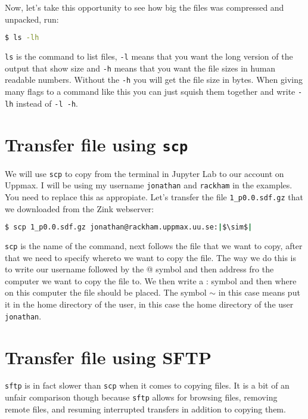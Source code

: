 \documentclass[watermark]{pbpreprint}
\begin{document}
\vspace{1\baselineskip}
Now, let's take this opportunity to see how big the files was compressed and
unpacked, run: 
\begin{lstlisting}[language=bash]
$ ls -lh
\end{lstlisting}
\texttt{ls} is the command to list files, \texttt{-l} means that you want the
long version of the output that show size and \texttt{-h} means that you want
the file sizes in human readable numbers. Without the \texttt{-h} you will get
the file size in bytes. When giving many flags to a command like this you can
just squish them together and write \texttt{-lh} instead of \texttt{-l -h}.

\section{Transfer file using \texttt{scp}}
 We will use \texttt{scp} to copy from the terminal
in Jupyter Lab to our account on Uppmax. I will be using my username
\texttt{jonathan} and \texttt{rackham} in the examples. You need to replace
this as appropiate. Let's transfer the file \texttt{1\_p0.0.sdf.gz} that we
downloaded from the Zink webserver:
\begin{lstlisting}[language=bash,escapechar={|}]
$ scp 1_p0.0.sdf.gz jonathan@rackham.uppmax.uu.se:|$\sim$|
\end{lstlisting}
\texttt{scp} is the name of the command, next follows the file that we want to
copy, after that we need to specify whereto we want to copy the file. The way
we do this is to write our username followed by the @ symbol and then address
fro the computer we want to copy the file to. We then write a : symbol and then
where on this computer the file should be placed. The symbol $\sim$ in this
case means put it in the home directory of the user, in this case the home
directory of the user \texttt{jonathan}.

\section{Transfer file using SFTP}
\texttt{sftp} is in fact slower than \texttt{scp} when it comes to copying
files. It is a bit of an unfair comparison though because \texttt{sftp} allows
for browsing files, removing remote files, and resuming interrupted transfers
in addition to copying them.
\end{document}
